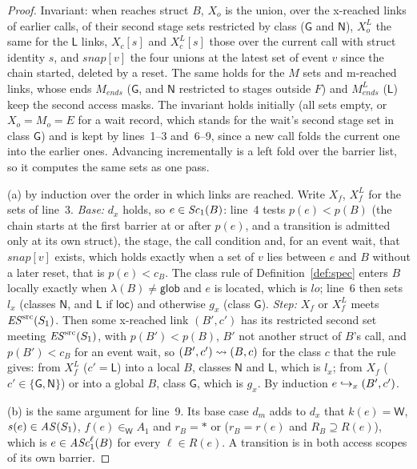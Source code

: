\begin{proof}
Invariant: when  reaches struct $B$, $X_o$ is the union, over the x-reached links of earlier calls, of
their second stage sets restricted by class ($\mathsf{G}$ and $\mathsf{N}$), $X^L_o$ the same for the $\mathsf{L}$
links, $X_c[s]$ and $X^L_c[s]$ those over the current call with struct identity $s$, and $\mathit{snap}[v]$ the four
unions at the latest set of event $v$ since the chain started, deleted by a reset. The same holds for the $M$ sets and
m-reached links, whose ends $M_{\mathit{ends}}$ ($\mathsf{G}$, and $\mathsf{N}$ restricted to stages outside $F$) and
$M^L_{\mathit{ends}}$ ($\mathsf{L}$) keep the second access masks. The invariant holds initially (all sets empty, or
$X_o = M_o = E$ for a wait record, which stands for the wait's second stage set in class $\mathsf{G}$) and is kept by
lines~1--3 and~6--9, since a new call folds the current one into the earlier ones. Advancing incrementally is a left
fold over the barrier list, so it computes the same sets as one pass.

(a) by induction over the order in which links are reached. Write $X_f$, $X^L_f$ for the sets of line~3.
\emph{Base:} $d_x$ holds, so $e \in \mathit{Sc}_{1}(B)$: line~4 tests $p(e) < p(B)$ (the chain starts at the first barrier at
or after $p(e)$, and a transition is admitted only at its own struct), the stage, the call condition and, for an
event wait, that $\mathit{snap}[v]$ exists, which holds exactly when a set of $v$ lies between $e$ and $B$ without a
later reset, that is $p(e) < c_B$. The class rule of Definition~\ref{def:spec} enters $B$ locally exactly when
$\lambda(B) \ne \mathsf{glob}$ and $e$ is located, which is $\mathit{lo}$; line~6 then sets $l_x$ (classes
$\mathsf{N}$, and $\mathsf{L}$ if $\mathsf{loc}$) and otherwise $g_x$ (class $\mathsf{G}$). \emph{Step:} $X_f$ or
$X^L_f$ meets $\mathit{ES}^{\mathrm{src}}(S_1)$. Then some x-reached link $(B',c')$ has its restricted second set meeting $\mathit{ES}^{\mathrm{src}}(S_1)$, with
$p(B') < p(B)$, $B'$ not another struct of $B$'s call, and $p(B') < c_B$ for an event wait, so $(B',c') \rightsquigarrow
(B,c)$ for the class $c$ that the rule gives: from $X^L_f$ ($c' = \mathsf{L}$) into a local $B$, classes $\mathsf{N}$
and $\mathsf{L}$, which is $l_x$; from $X_f$ ($c' \in \{\mathsf{G},\mathsf{N}\}$) or into a global $B$, class
$\mathsf{G}$, which is $g_x$. By induction $e \hookrightarrow_x (B',c')$.

(b) is the same argument for line~9. Its base case $d_m$ adds to $d_x$ that $k(e) = \mathsf{W}$, $s(e) \in
\mathit{AS}(S_1)$, $f(e) \in_{\mathsf{W}} A_1$ and $r_B = \ast$ or ($r_B = r(e)$ and $R_B \supseteq R(e)$), which is $e \in
\mathit{ASc}_{1}^{\ell}(B)$ for every $\ell \in R(e)$. A transition is in both access scopes of its own barrier.


\end{proof}

